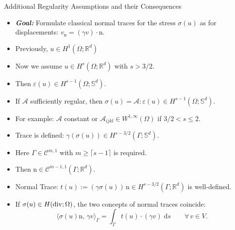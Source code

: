 \documentclass[10pt,aspectratio=169]{beamer}
\def\R{{\mathbb R}}
\def\S{{\mathbb S}}
\def\cA{{\mathcal A}}
\def\cC{{\mathcal C}}
\def\d{{\mathrm{d}}}
\def\ds{{\d s}}
\newcommand{\diver}{\operatornamewithlimits{div}}
\begin{document}
\begin{frame}{Additional Regularity Assumptions and their Consequences}
	\begin{itemize}
		\item \textbf{\em Goal:} Formulate classical normal traces for the stress $\sigma(u)$ as for displacements: $v_\mathrm{n} = (\gamma v)\cdot\mathrm{n}$.
		\item Previously, $u\in H^1(\Omega;\R^d)$
		\item Now we assume $u\in H^s(\Omega;\R^d)$ with $s>3/2$.
		\item Then $\varepsilon(u)\in H^{s-1}(\Omega;\S^d)$.
		\item If $\cA$ sufficiently regular, then $\sigma(u) = \cA:\varepsilon(u)\in H^{s-1}(\Omega;\S^d)$.
		\item For example: $\cA$ constant or $\cA_{ijkl}\in W^{1,\infty}(\Omega)$ if $3/2<s\le 2$.
		\item Trace is defined: $\gamma(\sigma(u))\in H^{s-3/2}(\Gamma;\S^d)$.
		\item Here $\Gamma\in\cC^{m,1}$ with $m\ge\lceil s-1\rceil$ is required.
		\item Then $\mathrm{n}\in \cC^{m-1,1}(\Gamma;\R^d)$.
		\item Normal Trace: $t(u):=(\gamma \sigma(u))\,\mathrm{n}\in H^{s-3/2}(\Gamma;\R^d)$ is well-defined.
		\item If $\sigma(u)\in H(\diver;\Omega)$, the two concepts of normal traces coincide:
		      \begin{equation*}
			      \langle \sigma(u)\mathrm{n},\, \gamma v\rangle_\Gamma  = \int_\Gamma t(u)\cdot (\gamma v)\;\ds\qquad \forall\, v\in V.
		      \end{equation*}
	\end{itemize}
\end{frame}
\end{document}
